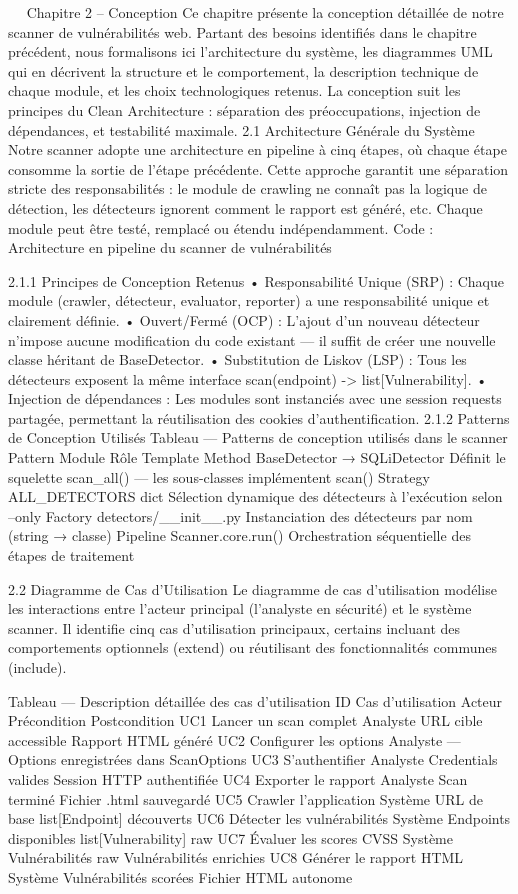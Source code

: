  
Chapitre 2 – Conception
Ce chapitre présente la conception détaillée de notre scanner de vulnérabilités web. Partant des besoins identifiés dans le chapitre précédent, nous formalisons ici l'architecture du système, les diagrammes UML qui en décrivent la structure et le comportement, la description technique de chaque module, et les choix technologiques retenus. La conception suit les principes du Clean Architecture : séparation des préoccupations, injection de dépendances, et testabilité maximale.
2.1  Architecture Générale du Système
Notre scanner adopte une architecture en pipeline à cinq étapes, où chaque étape consomme la sortie de l'étape précédente. Cette approche garantit une séparation stricte des responsabilités : le module de crawling ne connaît pas la logique de détection, les détecteurs ignorent comment le rapport est généré, etc. Chaque module peut être testé, remplacé ou étendu indépendamment.
Code : Architecture en pipeline du scanner de vulnérabilités
 
2.1.1  Principes de Conception Retenus
•	Responsabilité Unique (SRP) : Chaque module (crawler, détecteur, evaluator, reporter) a une responsabilité unique et clairement définie.
•	Ouvert/Fermé (OCP) : L'ajout d'un nouveau détecteur n'impose aucune modification du code existant — il suffit de créer une nouvelle classe héritant de BaseDetector.
•	Substitution de Liskov (LSP) : Tous les détecteurs exposent la même interface scan(endpoint) -> list[Vulnerability].
•	Injection de dépendances : Les modules sont instanciés avec une session requests partagée, permettant la réutilisation des cookies d'authentification.
2.1.2  Patterns de Conception Utilisés
Tableau — Patterns de conception utilisés dans le scanner
Pattern	Module	Rôle
Template Method	BaseDetector → SQLiDetector	Définit le squelette scan_all() — les sous-classes implémentent scan()
Strategy	ALL_DETECTORS dict	Sélection dynamique des détecteurs à l'exécution selon --only
Factory	detectors/__init__.py	Instanciation des détecteurs par nom (string → classe)
Pipeline	Scanner.core.run()	Orchestration séquentielle des étapes de traitement

2.2  Diagramme de Cas d'Utilisation
Le diagramme de cas d'utilisation modélise les interactions entre l'acteur principal (l'analyste en sécurité) et le système scanner. Il identifie cinq cas d'utilisation principaux, certains incluant des comportements optionnels (extend) ou réutilisant des fonctionnalités communes (include).
 
Tableau — Description détaillée des cas d'utilisation
ID	Cas d'utilisation	Acteur	Précondition	Postcondition
UC1	Lancer un scan complet	Analyste	URL cible accessible	Rapport HTML généré
UC2	Configurer les options	Analyste	—	Options enregistrées dans ScanOptions
UC3	S'authentifier	Analyste	Credentials valides	Session HTTP authentifiée
UC4	Exporter le rapport	Analyste	Scan terminé	Fichier .html sauvegardé
UC5	Crawler l'application	Système	URL de base	list[Endpoint] découverts
UC6	Détecter les vulnérabilités	Système	Endpoints disponibles	list[Vulnerability] raw
UC7	Évaluer les scores CVSS	Système	Vulnérabilités raw	Vulnérabilités enrichies
UC8	Générer le rapport HTML	Système	Vulnérabilités scorées	Fichier HTML autonome


